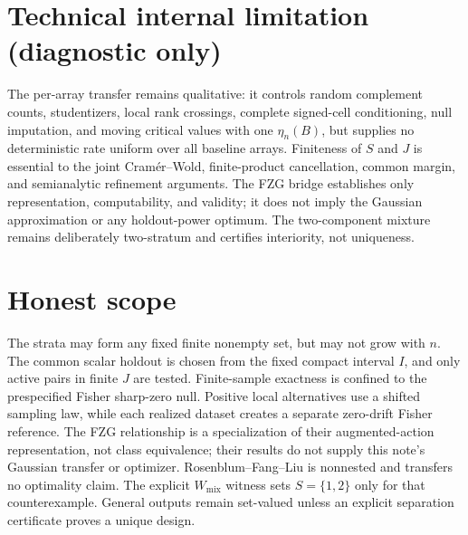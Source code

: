\documentclass{article}
\begin{document}
\section*{Technical internal limitation (diagnostic only)}

The per-array transfer remains qualitative: it controls random complement counts, studentizers, local rank crossings, complete signed-cell conditioning, null imputation, and moving critical values with one \(\eta_n(B)\), but supplies no deterministic rate uniform over all baseline arrays. Finiteness of \(S\) and \(J\) is essential to the joint Cramér--Wold, finite-product cancellation, common margin, and semianalytic refinement arguments. The FZG bridge establishes only representation, computability, and validity; it does not imply the Gaussian approximation or any holdout-power optimum. The two-component mixture remains deliberately two-stratum and certifies interiority, not uniqueness.

\section{Honest scope}

The strata may form any fixed finite nonempty set, but may not grow with \(n\). The common scalar holdout is chosen from the fixed compact interval \(I\), and only active pairs in finite \(J\) are tested. Finite-sample exactness is confined to the prespecified Fisher sharp-zero null. Positive local alternatives use a shifted sampling law, while each realized dataset creates a separate zero-drift Fisher reference. The FZG relationship is a specialization of their augmented-action representation, not class equivalence; their results do not supply this note's Gaussian transfer or optimizer. Rosenblum--Fang--Liu is nonnested and transfers no optimality claim. The explicit \(W_{\mathrm{mix}}\) witness sets \(S=\{1,2\}\) only for that counterexample. General outputs remain set-valued unless an explicit separation certificate proves a unique design.
\end{document}
